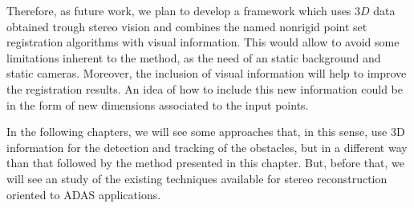 Therefore, as future work, we plan to develop a framework which uses $3D$ data obtained trough stereo vision and 
combines the named nonrigid point set registration algorithms with visual information. This would allow to avoid some limitations inherent to the method, as the need of an static background and static cameras. Moreover, the inclusion of visual information will help to improve the registration results. An idea of how to include this new information could be in the form of new dimensions associated to the input points.

In the following chapters, we will see some approaches that, in this sense, use 3D information for the detection and tracking of the obstacles, but in a different way than that followed by the method presented in this chapter. But, before that, we will see an study of the existing techniques available for stereo reconstruction oriented to \ac{ADAS} applications.




